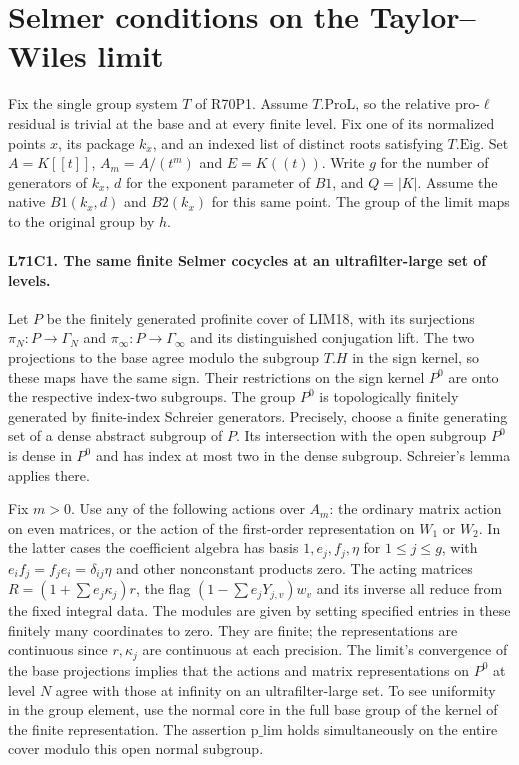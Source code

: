 \section{Selmer conditions on the Taylor--Wiles limit}

Fix the single group system $T$ of R70P1. Assume $T.\mathrm{ProL}$,
so the relative pro-$\ell$ residual is trivial at the base and at
every finite level. Fix one of its normalized points $x$, its
package $k_x$, and an indexed list of distinct roots satisfying
$T.\mathrm{Eig}$. Set $A=K[[t]]$, $A_m=A/(t^m)$ and
$E=K((t))$. Write $g$ for the number of generators of $k_x$,
$d$ for the exponent parameter of $B1$, and $Q=|K|$. Assume
the native $B1(k_x,d)$ and $B2(k_x)$ for this same point. The
group of the limit maps to the original group by $h$.

\paragraph{L71C1. The same finite Selmer cocycles at an ultrafilter-large set of levels.}
Let $P$ be the finitely generated profinite cover of LIM18, with
its surjections $\pi_N:P\to\Gamma_N$ and
$\pi_\infty:P\to\Gamma_\infty$ and its distinguished conjugation
lift. The two projections to the base agree modulo the subgroup
$T.H$ in the sign kernel, so these maps have the same sign.
Their restrictions on the
sign kernel $P^0$ are onto the respective index-two subgroups.
The group $P^0$ is topologically finitely generated by finite-index
Schreier generators. Precisely, choose a finite generating set
of a dense abstract subgroup of $P$. Its intersection with the
open subgroup $P^0$ is dense in $P^0$ and has index at most two
in the dense subgroup. Schreier's lemma applies there.

Fix $m>0$. Use any of the following actions over $A_m$: the
ordinary matrix action on even matrices, or the action of the
first-order representation on $W_1$ or $W_2$. In the latter
cases the coefficient algebra has basis
$1,e_j,f_j,\eta$ for $1\le j\le g$, with
$e_i f_j=f_j e_i=\delta_{ij}\eta$ and other nonconstant products
zero. The acting matrices $R=(1+\sum e_j\kappa_j)r$,
the flag $(1-\sum e_jY_{j,v})w_v$ and its inverse all reduce
from the fixed integral data. The modules are given by setting
specified entries in these finitely many coordinates to zero.
They are finite; the representations are continuous since
$r,\kappa_j$ are continuous at each precision. The limit's
convergence of the base projections implies that the actions and
matrix representations on $P^0$ at level $N$ agree with those
at infinity on an ultrafilter-large set. To see uniformity in
the group element, use the normal core in the full base group
of the kernel of the finite representation. The assertion
$\mathrm{p\_lim}$ holds simultaneously on the entire cover
modulo this open normal subgroup.

